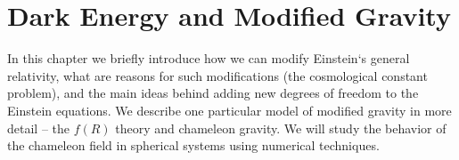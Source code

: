 \chapter{Dark Energy and Modified Gravity}
\label{chpt:de_mg}
In this chapter we briefly introduce how we can modify Einstein`s general relativity, what are reasons for such modifications (the cosmological constant problem), and the main ideas behind adding new degrees of freedom to the Einstein equations. We describe one particular model of modified gravity in more detail -- the $f(R)$ theory and chameleon gravity. We will study the behavior of the chameleon field in spherical systems using numerical techniques.







